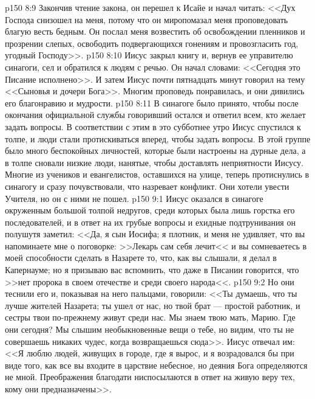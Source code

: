 \vs p150 8:9 Закончив чтение закона, он перешел к Исайе и начал читать: <<Дух Господа снизошел на меня, потому что он миропомазал меня проповедовать благую весть бедным. Он послал меня возвестить об освобождении пленников и прозрении слепых, освободить подвергающихся гонениям и провозгласить год, угодный Господу>>.
\vs p150 8:10 Иисус закрыл книгу и, вернув ее управителю синагоги, сел и обратился к людям с речью. Он начал словами: <<Сегодня это Писание исполнено>>. И затем Иисус почти пятнадцать минут говорил на тему <<Сыновья и дочери Бога>>. Многим проповедь понравилась, и они дивились его благонравию и мудрости.
\vs p150 8:11 В синагоге было принято, чтобы после окончания официальной службы говоривший остался и ответил всем, кто желает задать вопросы. В соответствии с этим в это субботнее утро Иисус спустился к толпе, и люди стали протискиваться вперед, чтобы задать вопросы. В этой группе было много беспокойных личностей, которые были настроены на дурные дела, а в толпе сновали низкие люди, нанятые, чтобы доставлять неприятности Иисусу. Многие из учеников и евангелистов, оставшихся на улице, теперь протиснулись в синагогу и сразу почувствовали, что назревает конфликт. Они хотели увести Учителя, но он с ними не пошел.
\vs p150 9:1 Иисус оказался в синагоге окруженным большой толпой недругов, среди которых была лишь горстка его последователей, и в ответ на их грубые вопросы и ехидные подтрунивания он полушутя заметил: <<Да, я сын Иосифа; я плотник, и меня не удивляет, что вы напоминаете мне о поговорке: >>Лекарь сам себя лечит<< и вы сомневаетесь в моей способности сделать в Назарете то, что, как вы слышали, я делал в Капернауме; но я призываю вас вспомнить, что даже в Писании говорится, что >>нет пророка в своем отечестве и среди своего народа<<.
\vs p150 9:2 Но они теснили его и, показывая на него пальцами, говорили: <<Ты думаешь, что ты лучше жителей Назарета; ты ушел от нас, но твой брат --- простой работник, и сестры твои по\hyp{}прежнему живут среди нас. Мы знаем твою мать, Марию. Где они сегодня? Мы слышим необыкновенные вещи о тебе, но видим, что ты не совершаешь никаких чудес, когда возвращаешься сюда>>. Иисус отвечал им: <<Я люблю людей, живущих в городе, где я вырос, и я возрадовался бы при виде того, как все вы входите в царствие небесное, но деяния Бога определяются не мной. Преображения благодати ниспосылаются в ответ на живую веру тех, кому они предназначены>>.
